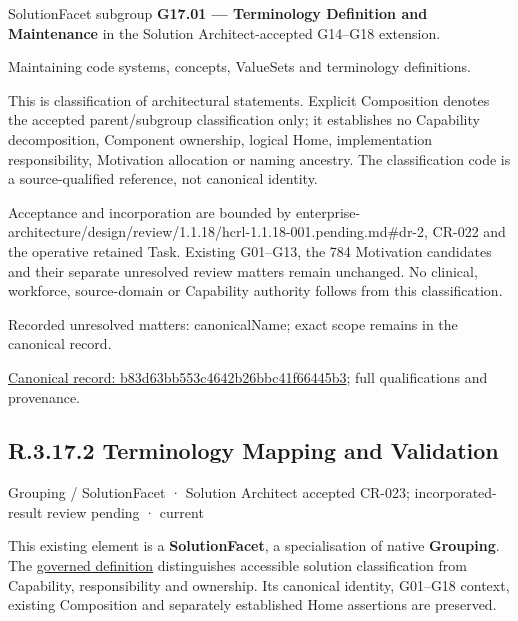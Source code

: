 SolutionFacet subgroup \textbf{G17.01 — Terminology Definition and Maintenance} in the Solution Architect-accepted G14–G18 extension.



Maintaining code systems, concepts, ValueSets and terminology definitions.



This is classification of architectural statements. Explicit Composition denotes the accepted parent/subgroup classification only; it establishes no Capability decomposition, Component ownership, logical Home, implementation responsibility, Motivation allocation or naming ancestry. The classification code is a source-qualified reference, not canonical identity.



Acceptance and incorporation are bounded by enterprise-architecture/design/review/1.1.18/hcrl-1.1.18-001.pending.md\#dr-2, CR-022 and the operative retained Task. Existing G01–G13, the 784 Motivation candidates and their separate unresolved review matters remain unchanged. No clinical, workforce, source-domain or Capability authority follows from this classification.


{\small Recorded unresolved matters: canonicalName; exact scope remains in the canonical record.}\par
{\footnotesize \href{../../../../../../../continuum/grouping/b83d63bb553c4642b26bbc41f66445b3.md}{Canonical record: b83d63bb553c4642b26bbc41f66445b3}; full qualifications and provenance.}\par
\subsection*{R.3.17.2 Terminology Mapping and Validation}
\label{navigation:R.3.17.2}

\label{element:8655d81cd41647449c3b1a10ffd453b3}
{\small Grouping / SolutionFacet · Solution Architect accepted CR-023; incorporated-result review pending · current}\par

This existing element is a \textbf{SolutionFacet}, a specialisation of native
\textbf{Grouping}. The \href{\detokenize{../../../../../../../governance/continuum-representation.md#solutionfacet-classification--1119-candidate}}{governed definition}
distinguishes accessible solution classification from Capability, responsibility
and ownership. Its canonical identity, G01–G18 context, existing Composition
and separately established Home assertions are preserved.



